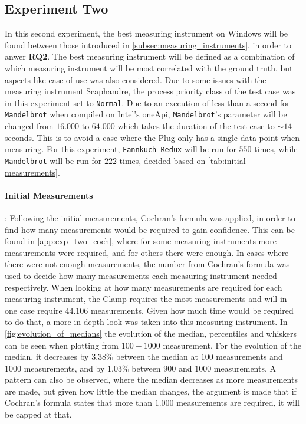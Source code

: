 \subsection{Experiment Two}\label{subsec:exp_two}

In this second experiment, the best measuring instrument on Windows will be found between those introduced in \cref{subsec:measuring_instruments}, in order to anwer \textbf{RQ2}. The best measuring instrument will be defined as a combination of which measuring instrument will be most correlated with the ground truth, but aspects like ease of use was also considered. Due to some issues with the measuring instrument Scaphandre, the process priority class of the test case was in this experiment set to \texttt{Normal}. Due to an execution of less than a second for \texttt{Mandelbrot} when compiled on Intel's oneApi, \texttt{Mandelbrot}'s parameter will be changed from $16.000$ to $64.000$ which takes the duration of the test case to $\sim 14$ seconds. This is to avoid a case where the Plug only has a single data point when measuring. For this experiment, \texttt{Fannkuch-Redux} will be run for $550$ times, while \texttt{Mandelbrot} will be run for $222$ times, decided based on \cref{tab:initial-measurements}.

\paragraph{Initial Measurements}: Following the initial measurements, Cochran's formula was applied, in order to find how many measurements would be required to gain confidence. This can be found in \cref{app:exp_two_coch}, where for some measuring instruments more measurements were required, and for others there were enough. In cases where there were not enough measurements, the number from Cochran's formula was used to decide how many measurements each measuring instrument needed respectively. When looking at how many measurements are required for each measuring instrument, the Clamp requires the most measurements and will in one case require $44.106$ measurements. Given how much time would be required to do that, a more in depth look was taken into this measuring instrument. In \cref{fig:evolution_of_medians} the evolution of the median, percentiles and whiskers can be seen when plotting from $100-1000$ measurement. For the evolution of the median, it decreases by $3.38\%$ between the median at $100$ measurements and $1000$ measurements, and by $1.03\%$ between $900$ and $1000$ measurements. A pattern can also be observed, where the median decreases as more measurements are made, but given how little the median changes, the argument is made that if Cochran's formula states that more than $1.000$ measurements are required, it will be capped at that.

